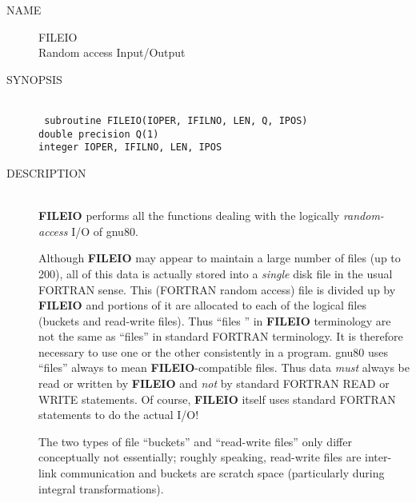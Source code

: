 
\newpage
\setcounter{page}{1}
\begin{description}
\item[NAME] FILEIO \\
Random access Input/Output
\item[SYNOPSIS] \ \\
{\tt
   subroutine FILEIO(IOPER, IFILNO, LEN, Q, IPOS) \\
   double precision Q(1) \\
   integer IOPER, IFILNO, LEN, IPOS \\
}
\item[DESCRIPTION] \ \\
{\bf FILEIO} performs all the  functions  dealing  with the logically
{\em random-access} I/O of gnu80.
 
Although {\bf FILEIO} may appear to maintain a large  number  of
files  (up  to 200), all of this data is actually stored into a
{\em single}  disk file in the usual FORTRAN sense.  
This (FORTRAN random access) file is divided  up by {\bf FILEIO}
and  portions of it are allocated to each of the logical files
(buckets and read-write files). Thus ``files '' in
{\bf FILEIO} terminology are not the same as ``files'' 
in standard FORTRAN terminology. It is therefore necessary to
use one or the other consistently in a program. gnu80 uses
``files'' always to mean {\bf FILEIO}-compatible
files. Thus data {\em must} always be read or written by {\bf FILEIO}
and {\em not} by standard FORTRAN READ or WRITE statements.
Of course, {\bf FILEIO} itself uses standard FORTRAN statements
to do the actual I/O!

The two types of file ``buckets'' and ``read-write
files'' only differ conceptually not essentially; roughly
speaking, read-write files are inter-link communication
and buckets are scratch space (particularly during integral
transformations).


\end{description}
